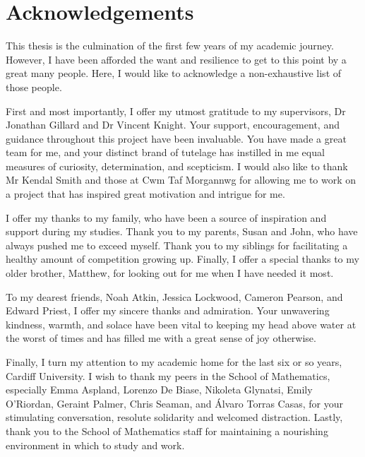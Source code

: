 \chapter*{Acknowledgements}

This thesis is the culmination of the first few years of my academic journey.
However, I have been afforded the want and resilience to get to this point by a
great many people. Here, I would like to acknowledge a non-exhaustive list of
those people.

First and most importantly, I offer my utmost gratitude to my supervisors, Dr
Jonathan Gillard and Dr Vincent Knight. Your support, encouragement, and
guidance throughout this project have been invaluable. You have made a great
team for me, and your distinct brand of tutelage has instilled in me equal
measures of curiosity, determination, and scepticism. I would also like to thank
Mr Kendal Smith and those at Cwm Taf Morgannwg for allowing me to work on a
project that has inspired great motivation and intrigue for me.

I offer my thanks to my family, who have been a source of inspiration and
support during my studies. Thank you to my parents, Susan and John, who have
always pushed me to exceed myself. Thank you to my siblings for facilitating a
healthy amount of competition growing up. Finally, I offer a special thanks to
my older brother, Matthew, for looking out for me when I have needed it most.

To my dearest friends, Noah Atkin, Jessica Lockwood, Cameron Pearson, and Edward
Priest, I offer my sincere thanks and admiration. Your unwavering kindness,
warmth, and solace have been vital to keeping my head above water at the worst
of times and has filled me with a great sense of joy otherwise.

Finally, I turn my attention to my academic home for the last six or so years,
Cardiff University. I wish to thank my peers in the School of Mathematics,
especially Emma Aspland, Lorenzo De Biase, Nikoleta Glynatsi, Emily O’Riordan,
Geraint Palmer, Chris Seaman, and \'{A}lvaro Torras Casas, for your stimulating
conversation, resolute solidarity and welcomed distraction. Lastly, thank you to
the School of Mathematics staff for maintaining a nourishing environment in
which to study and work. 
